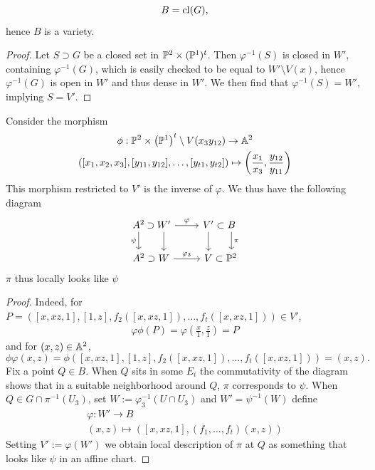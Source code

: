     \begin{lemma}
        $$
            B = \mathrm{cl}(G),
        $$
        hence $B$ is a variety. 
    \end{lemma}
    \begin{proof}
        Let $S\supset G$ be a closed set in $\mathbb{P}^2\times (\mathbb{P}^1)^t$. Then $\varphi^{-1}(S)$ is closed in $W'$, containing $\varphi^{-1}(G)$, which is easily checked to be equal to $W'\setminus V(x)$, hence $\varphi^{-1}(G)$ is open in $W'$ and thus dense in $W'$. We then find that $\varphi^{-1}(S)=W'$, implying $S=V'$. 
    \end{proof}
    \begin{lemma}
        Consider the morphism
        \begin{gather*}
            \phi: \mathbb{P}^2\times \left(\mathbb{P}^1\right)^t\setminus V(x_3y_{12})\rightarrow \mathbb{A}^2\\
            ([x_1,x_2,x_3],[y_{11},y_{12}],\dots,[y_{t1},y_{t2}])\mapsto \left(\frac{x_1}{x_3},\frac{y_{12}}{y_{11}}\right)
        \end{gather*}
         This morphism restricted to $V'$ is the inverse of $\varphi$. We thus have the following diagram 
\[
\begin{tikzcd}
A^{2} \arrow[r, phantom, "\mathrel{\supset}"] \arrow[d, "\psi"'] &
  [-2em] %
W' \arrow[r, "\varphi"] \arrow[d] &
V' \arrow[r, phantom, "\mathrel{\subset}"] \arrow[d] &
  [-2em] %
B \arrow[d, "\pi"] \\
A^{2} \arrow[r, phantom, "\mathrel{\supset}"] &
  [-2em]
W \arrow[r, "\varphi_{3}"] &
  V \arrow[r, phantom, "\mathrel{\subset}"] &
  [-2em]
\mathbb{P}^{2}
\end{tikzcd}
\]
    $\pi$ thus locally looks like $\psi$
    \end{lemma}
    \begin{proof}
        Indeed, for $P=([x,xz,1],[1,z],f_{2}([x,xz,1]),\dots, f_t([x,xz,1]))\in V'$,
        \begin{align*}
            \varphi\phi(P)= \varphi(\frac{x}{1},\frac{z}{1})= P
        \end{align*}
        and for $(x,z)\in \mathbb{A}^2$,
        $$
            \phi\varphi(x,z)=\phi([x,xz,1],[1,z],f_{2}([x,xz,1]),\dots, f_t([x,xz,1]))=(x,z).
        $$
        Fix a point $Q\in B$. When $Q$ sits in some $E_i$ the commutativity of the diagram shows that in a suitable neighborhood around $Q$, $\pi$ corresponds to $\psi$. When $Q\in G\cap \pi^{-1}(U_3)$, set $W:= \varphi_3^{-1}(U\cap U_3)$ and $W'=\psi^{-1}(W)$ define 
        \begin{gather*}
            \varphi: W' \rightarrow B\\
            (x,z)\mapsto ([x,xz,1],(f_1,\dots,f_t)(x,z))
        \end{gather*}  
        Setting $V' := \varphi(W')$ we obtain local description of $\pi$ at $Q$ as something that looks like $\psi$ in an affine chart. 
    \end{proof}
